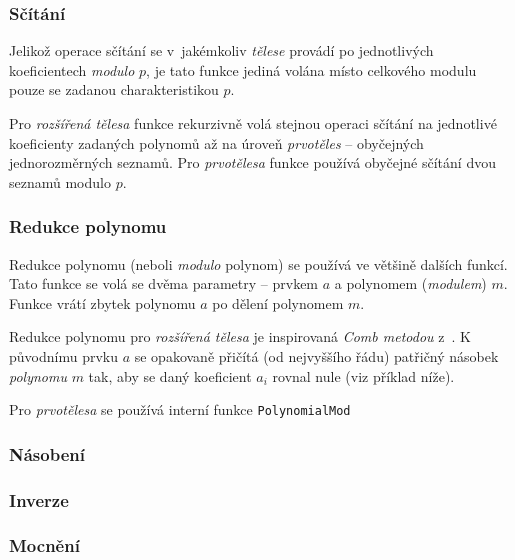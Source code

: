 \documentclass[thesis=M,czech,hidelinks]{FITthesis}[2012/06/26]
\begin{document}
\subsubsection{Sčítání}
Jelikož operace sčítání se v~jakémkoliv \emph{tělese} provádí po jednotlivých
koeficientech \emph{modulo} $p$, je tato funkce jediná volána místo celkového
modulu pouze se zadanou charakteristikou $p$.

Pro \emph{rozšířená tělesa} funkce rekurzivně volá stejnou operaci sčítání na
jednotlivé koeficienty zadaných polynomů až na úroveň \emph{prvotěles} --
obyčejných jednorozměrných seznamů. Pro \emph{prvotělesa} funkce používá
obyčejné sčítání dvou seznamů modulo $p$.



\subsubsection{Redukce polynomu}
Redukce polynomu (neboli \emph{modulo} polynom) se používá ve většině dalších
funkcí. Tato funkce se volá se dvěma parametry -- prvkem $a$ a polynomem
(\emph{modulem}) $m$. Funkce vrátí zbytek polynomu $a$ po dělení polynomem $m$.

Redukce polynomu pro \emph{rozšířená tělesa} je inspirovaná \emph{Comb metodou}
z~\cite{Paar_Efficient}. K původnímu prvku $a$ se opakovaně přičítá (od
nejvyššího řádu) patřičný násobek \emph{polynomu} $m$ tak, aby se daný
koeficient $a_i$ rovnal nule (viz příklad níže).

Pro \emph{prvotělesa} se používá interní funkce \texttt{PolynomialMod}


\subsubsection{Násobení}
\subsubsection{Inverze}
\subsubsection{Mocnění}
\end{document}
